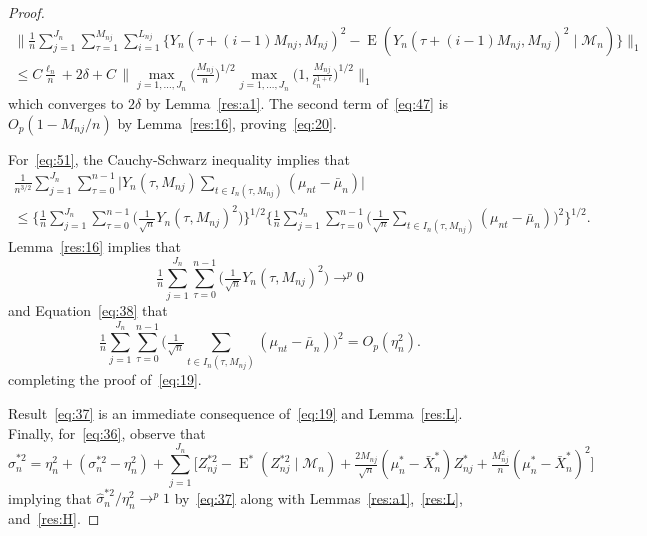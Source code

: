 \documentclass[11pt]{article}
\theoremstyle{definition}
\DeclareMathOperator{\E}{E}
\begin{document}
\begin{proof}
  \begin{multline*}
    \Big\lVert\tfrac{1}{n} \sum_{j=1}^{J_n} \sum_{\tau=1}^{M_{nj}}
    \sum_{i=1}^{L_{nj}}\big\{ Y_n(\tau+(i-1)M_{nj}, M_{nj})^2 -
    \E(Y_n(\tau+(i-1)M_{nj}, M_{nj})^2 \mid
    \mathcal{M}_n)\big\}\Big\rVert_1 \\ \leq C \tfrac{\ell_n}{n} + 2
    \delta + C\, \Big\lVert \max_{j =
      1,\dots,J_n}\big(\tfrac{M_{nj}}{n}\big)^{1/2} \max_{j =
      1,\dots,J_n}\big(1,
    \tfrac{M_{nj}}{\ell_n^{1+\epsilon}}\big)^{1/2} \Big\rVert_1
  \end{multline*} 
  which converges to $2 \delta$ by Lemma~\ref{res:a1}.  The second
  term of~\eqref{eq:47} is $O_{p}(1 - M_{nj}/n)$ by Lemma~\ref{res:16},
  proving~\eqref{eq:20}.  

  For~\eqref{eq:51}, the Cauchy-Schwarz inequality implies that
  \begin{multline*}
    \tfrac{1}{n^{3/2}} \sum_{j=1}^{J_n} \sum_{\tau=0}^{n-1}
    \Big\lvert Y_{n}(\tau, M_{nj})\sum_{t\in I_n(\tau, M_{nj})}(\mu_{nt} -
    \bar{\mu}_n)\Big\rvert \\\leq \Big\{\tfrac{1}{n} \sum_{j=1}^{J_n}
    \sum_{\tau=0}^{n-1} \big(\tfrac{1}{\sqrt{n}} Y_n(\tau,
    M_{nj})^2\big)\Big\}^{1/2} \Big\{\tfrac{1}{n} \sum_{j=1}^{J_n}
    \sum_{\tau=0}^{n-1} \Big(\tfrac{1}{\sqrt{n}} \sum_{t \in I_n(\tau,
      M_{nj})} (\mu_{nt} - \bar{\mu}_{n} )\Big)^2\Big\}^{1/2}.
  \end{multline*}
  Lemma~\ref{res:16} implies that
  \begin{equation}
    \label{eq:23}
    \tfrac{1}{n} \sum_{j=1}^{J_n}
    \sum_{\tau=0}^{n-1} \big(\tfrac{1}{\sqrt{n}} Y_n(\tau,
    M_{nj})^2\big) \to^p 0
  \end{equation}
  and Equation~\eqref{eq:38} that
  \begin{equation*}
    \tfrac{1}{n} \sum_{j=1}^{J_n} \sum_{\tau=0}^{n-1}
    \Big(\tfrac{1}{\sqrt{n}} \sum_{t \in I_n(\tau, M_{nj})} (\mu_{nt} -
    \bar{\mu}_{n} )\Big)^2 = O_p(\eta_n^2).
  \end{equation*}
  completing the proof of~\eqref{eq:19}.

  Result~\eqref{eq:37} is an immediate consequence of~\eqref{eq:19}
  and Lemma~\ref{res:L}.  Finally, for~\eqref{eq:36}, observe that
  \begin{equation*}
    \hat{\sigma}_n^{*2} = \eta_n^2 + (\sigma_n^{*2} - \eta_n^2) + \sum_{j=1}^{J_n}\Big[
    Z_{nj}^{*2} - \E^*(Z_{nj}^{*2} \mid \mathcal{M}_n)
    + \tfrac{2 M_{nj}}{\sqrt{n}} (\mu_n^{*} - \bar{X}_n^{*})
    Z_{nj}^{*} + \tfrac{M_{nj}^2}{n} (\mu_n^{*} - \bar{X}_n^{*})^2 \Big]
  \end{equation*}
  implying that $\hat{\sigma}_n^{*2}/\eta_n^2 \to^p 1$
  by~\eqref{eq:37} along with Lemmas~\ref{res:a1},~\ref{res:L},
  and~\ref{res:H}.
\end{proof}
\end{document}
